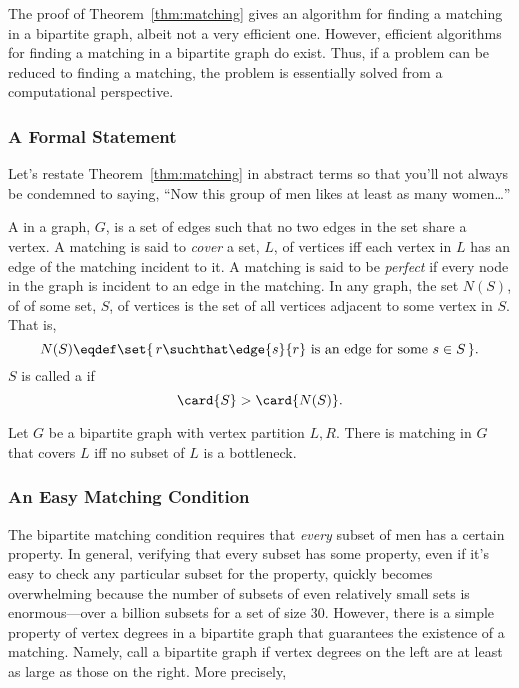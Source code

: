 The proof of Theorem~\ref{thm:matching} gives an algorithm for finding
a matching in a bipartite graph, albeit not a very efficient one.
However, efficient algorithms for finding a matching in a bipartite
graph do exist.  Thus, if a problem can be reduced to finding a
matching, the problem is essentially solved from a computational
perspective.

\subsubsection{A Formal Statement}

Let's restate Theorem~\ref{thm:matching} in abstract terms so that
you'll not always be condemned to saying, ``Now this group of men
likes at least as many women\dots''

\begin{definition}\label{def:5K}

A  in a graph, $G$, is a set of edges such that no two
edges in the set share a vertex.  A matching is said to \emph{cover} a
set, $L$, of vertices iff each vertex in $L$ has an edge of the
matching incident to it.  A matching is said to be \emph{perfect} if
every node in the graph is incident to an edge in the matching.  In
any graph, the set $N(S)$, of  of some set, $S$, of
vertices is the set of all vertices adjacent to some vertex in $S$.
That is,
\[
N(S) \eqdef \set{\,r \suchthat \edge{s}{r}\text{ is an edge for some }s \in S\,}.
\]
$S$ is called a  if
\[
\card{S} > \card{N(S)}.
\]
\end{definition}

\begin{theorem}\label{thm:halls}
  Let $G$ be a bipartite graph with vertex partition $L,R$.  There is matching in $G$
  that covers $L$ iff no subset of $L$ is a bottleneck.
\end{theorem}

\subsubsection{An Easy Matching Condition}

The bipartite matching condition requires that \emph{every} subset of
men has a certain property.  In general, verifying that every subset
has some property, even if it's easy to check any particular subset
for the property, quickly becomes overwhelming because the number of
subsets of even relatively small sets is enormous---over a billion
subsets for a set of size 30.  However, there is a simple property of
vertex degrees in a bipartite graph that guarantees the existence of a
matching.  Namely, call a bipartite graph 
if vertex degrees on the left are at least as large as those on the
right.  More precisely,

